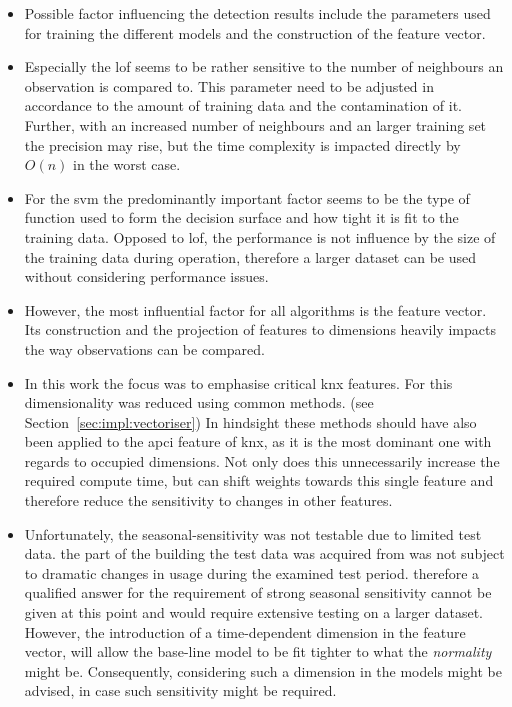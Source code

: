 \begin{itemize}
	\item Possible factor influencing the detection results include the parameters used for training the different models and the construction of the feature vector.
	\item Especially the \gls{lof} seems to be rather sensitive to the number of neighbours an observation is compared to. This parameter need to be adjusted in accordance to the amount of training data and the contamination of it. Further, with an increased number of neighbours and an larger training set the precision may rise, but the time complexity is impacted directly by \(O(n)\) in the worst case.
	\item For the \gls{svm} the predominantly important factor seems to be the type of function used to form the decision surface and how tight it is fit to the training data. Opposed to \gls{lof}, the performance is not influence by the size of the training data during operation, therefore a larger dataset can be used without considering performance issues.
	\item However, the most influential factor for all algorithms is the feature vector. Its construction and the projection of features to dimensions heavily impacts the way observations can be compared.
	\item In this work the focus was to emphasise critical \gls{knx} features. For this dimensionality was reduced using common methods. (see Section~\ref{sec:impl:vectoriser}) In hindsight these methods should have also been applied to the \gls{apci} feature of \gls{knx}, as it is the most dominant one with regards to occupied dimensions. Not only does this unnecessarily increase the required compute time, but can shift weights towards this single feature and therefore reduce the sensitivity to changes in other features.	
	
	\item Unfortunately, the seasonal-sensitivity was not testable due to limited test data.
		\subitem the part of the building the test data was acquired from was not subject to dramatic changes in usage during the examined test period.
		\subitem therefore a qualified answer for the requirement of strong seasonal sensitivity cannot be given at this point and would require extensive testing on a larger dataset.
		\subitem However, the introduction of a time-dependent dimension in the feature vector, will allow the base-line model to be fit tighter to what the \emph{normality} might be. Consequently, considering such a dimension in the models might be advised, in case such sensitivity might be required.
		

\end{itemize}
